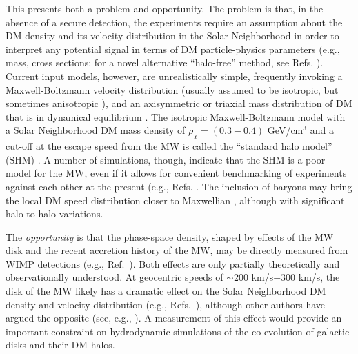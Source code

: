 \documentclass[letterpaper,11pt]{article}
\begin{document}
This presents both a problem and opportunity. The problem is that, in the absence of a secure detection, the experiments require an assumption about the DM density and its velocity distribution in the Solar Neighborhood in order to interpret any potential signal in terms of DM particle-physics parameters (e.g., mass, cross sections; for a novel alternative ``halo-free'' method, see Refs. \cite{Blennow:2015oea,Ferrer:2015bta}).  Current input models, however, are unrealistically simple, frequently invoking a Maxwell-Boltzmann velocity distribution (usually assumed to be isotropic, but sometimes anisotropic \cite{Green:2002a}), and an axisymmetric or triaxial mass distribution of DM that is in dynamical equilibrium \citep{Peter:2009mi,Catena2012,Strigari:2013iaa,Read:2014qva,Pato:2015dua}.  The isotropic Maxwell-Boltzmann model with a Solar Neighborhood DM mass density of $\rho_\chi = (0.3-0.4)$ GeV/cm$^3$ and a cut-off at the escape speed from the MW is called the ``standard halo model'' (SHM) \cite{Lewin:1995rx,Green:2017odb}.  A number of simulations, though, indicate that the SHM is a poor model for the MW, even if it allows for convenient benchmarking of experiments against each other at the present (e.g., Refs. \cite{Lisanti:2011as,Sloane:2016,Bozorgnia:2016,Mao:2014}. 
The inclusion of baryons may bring the local DM speed distribution closer to Maxwellian \cite{Vogelsberger2009,Kuhlen:2010,Kelso:2016}, although with significant halo-to-halo variations.

The \textit{opportunity} is that the phase-space density, shaped by effects of the MW disk and the recent accretion history of the MW, may be directly measured from WIMP detections (e.g., Ref.~\cite{Peter:2013}).  Both effects are only partially theoretically and observationally understood. 
At geocentric speeds of $\sim 200$ km/s$-300$ km/s, the disk of the MW likely has a dramatic effect on the Solar Neighborhood DM density and velocity distribution (e.g., Refs.~\cite{Kuhlen:2013tra,Sloane:2016, deSalas:2019}), although other authors have argued the opposite (see, e.g., \cite{Kelso:2016,Bozorgnia:2016}).  A measurement of this effect would provide an important constraint on hydrodynamic simulations of the co-evolution of galactic disks and their DM halos.
\end{document}
